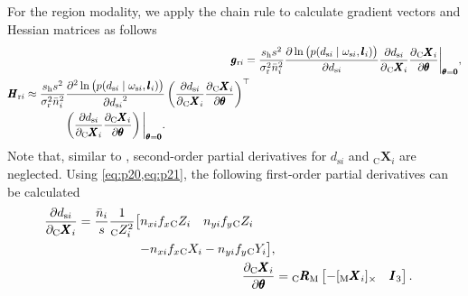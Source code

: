 \documentclass[10pt,twocolumn,letterpaper]{article}
\begin{document}
For the region modality, we apply the chain rule to calculate gradient vectors and Hessian matrices as follows
\begin{align}\label{eq:o12}
	\pmb{g}_{\textrm{r}i} &= \frac{s_\textrm{h}s^2}{\sigma_\textrm{r}^2\bar{n}_i^2}
	\frac{\partial\ln\big(p(d_{\textrm{s}i}\mid\omega_{\textrm{s}i},\pmb{l}_i)\big)}{\partial d_{\textrm{s}i}}
	\frac{\partial d_{\textrm{s}i}}{\partial {}_\textrm{C}\pmb{X}_{i}}
	\frac{\partial {}_\textrm{C}\pmb{X}_{i}}{\partial \pmb{\theta}}
	\bigg\vert_{\pmb{\theta}=\pmb{0}},\\\label{eq:o13}
	\begin{split}
		\pmb{H}_{\textrm{r}i} &\approx \frac{s_\textrm{h}s^2}{\sigma_\textrm{r}^2\bar{n}_i^2}
		\frac{\partial^2\ln\big(p(d_{\textrm{s}i}\mid\omega_{\textrm{s}i},\pmb{l}_i)\big)}{\partial {d_{\textrm{s}i}}^2}
		\left(
		\frac{\partial d_{\textrm{s}i}}{\partial{}_\textrm{C}\pmb{X}_{i}}\frac{\partial {}_\textrm{C}\pmb{X}_{i}}{\partial \pmb{\theta}}
		\right)^\top\\
		&\hspace{1.25cm} \left(\frac{\partial d_{\textrm{s}i}}{\partial _\textrm{C}\pmb{X}_{i}}
		\frac{\partial _\textrm{C}\pmb{X}_{i}}{\partial \pmb{\theta}}\right)
		\bigg\vert_{\pmb{\theta}=\pmb{0}}.
	\end{split}
\hspace{-0.2cm}
\end{align}
Note that, similar to \cite{Stoiber2020b}, second-order partial derivatives for $d_{\textrm{s}i}$ and $_\textrm{C}\pmb{X}_{i}$ are neglected.
Using \cref{eq:p20,eq:p21}, the following first-order partial derivatives can be calculated
\begin{align}\label{eq:o14}
	\begin{split}
		\frac{\partial d_{\textrm{s}i}}{\partial _\textrm{C}\pmb{X}_{i}} &=
		\frac{\bar{n}_i}{s}
		\frac{1}{{} _\textrm{C}Z_{i}^2}
		\big[
		\begin{matrix}
			n_{xi} f_x {}_\textrm{C}Z_{i} & n_{yi} f_y {}_\textrm{C}Z_{i}
		\end{matrix}\\
		&\hspace{1.75cm}\begin{matrix}
			-n_{xi} f_x {}_\textrm{C}X_{i} - n_{yi} f_y {}_\textrm{C}Y_{i}
		\end{matrix}
		\big],
	\end{split}\\\label{eq:o15}
	\frac{\partial _\textrm{C}\pmb{X}_{i}}{\partial\pmb{\theta}} &=
	{}_\textrm{C}\pmb{R}_\textrm{M} 
	\begin{bmatrix}
		-[_\textrm{M}\pmb{X}_i]_\times & \pmb{I}_3
	\end{bmatrix}.
\end{align}
\end{document}
